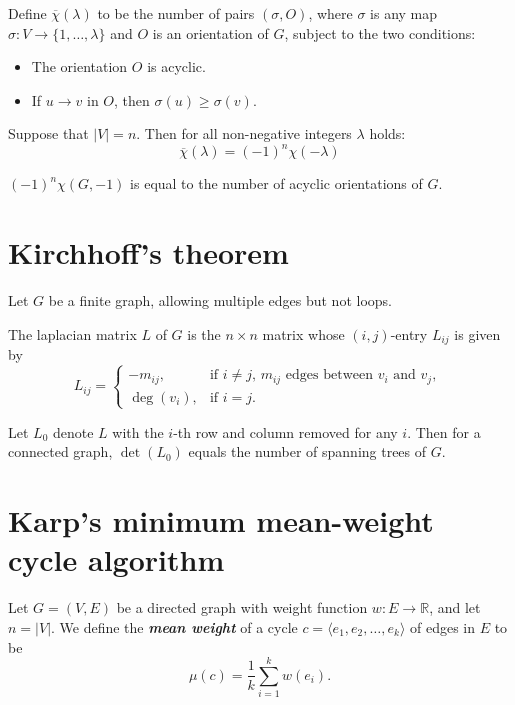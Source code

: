 Define $\overline{\chi}(\lambda)$ to be the number of pairs $(\sigma, O)$, 
where $\sigma$ is any map $\sigma : V \rightarrow \{1, \dots, \lambda\}$ and $O$ is an orientation of $G$, 
subject to the two conditions:
\begin{itemize}
\item The orientation $O$ is acyclic.
\item If $u \rightarrow v$ in $O$, then $\sigma (u) \ge \sigma (v)$.
\end{itemize}

\begin{theorem}
    Suppose that $|V| = n$. Then for all non-negative integers $\lambda$ holds:
    $$\overline{\chi}(\lambda) = (-1)^n \chi(-\lambda)$$
\end{theorem}

\begin{corollary}
    $(-1)^n \chi(G, -1)$ is equal to the number of acyclic orientations of $G$.
\end{corollary}

\section*{Kirchhoff's theorem}

Let $G$ be a finite graph, allowing multiple edges but not loops.

The laplacian matrix $L$ of $G$ is the $n \times n$ matrix whose
$(i, j)$-entry $L_{i j}$ is given by
\begin{displaymath}
L_{i j} = \left\{ \begin{array}{ll}
-m_{i j}, & \textrm{if $i \ne j$, $m_{i j}$ edges between $v_i$ and $v_j$, } \\
\deg(v_i), & \textrm{if $i = j$.}
\end{array} \right.
\end{displaymath}

Let $L_0$ denote $L$ with the $i$-th row and column removed for any $i$.
Then for a connected graph, $\det(L_0)$ equals the number of spanning trees of $G$.

\section*{Karp's minimum mean-weight cycle algorithm}

Let $G = (V, E)$ be a directed graph with weight function $w: E \to \mathbb{R}$,
and let $n = |V|$.
We define the \textbf{\textit{mean weight}} of a cycle
$c= \langle e_1, e_2, \dots, e_k \rangle$ of edges in $E$ to be
$$\mu(c) = \frac{1}{k} \sum_{i=1}^k w(e_i).$$


